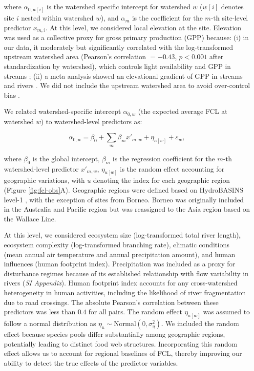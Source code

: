 \documentclass[11pt, class=article, crop=false]{standalone}
\theoremstyle{definition}
\begin{document}
where $\alpha_{0, w[i]}$ is the watershed specific intercept for watershed $w$ ($w[i]$ denotes site $i$ nested within watershed $w$), and $\alpha_m$ is the coefficient for the $m$-th site-level predictor $x_{m, i}$.
At this level, we considered local elevation at the site. 
Elevation was used as a collective proxy for gross primary production (GPP) because: (i) in our data, it moderately but significantly correlated with the log-transformed upstream watershed area (Pearson's correlation $= -0.43$, $p < 0.001$ after standardization by watershed), which controls light availability and GPP in streams \citep{finlay_light-mediated_2011, finlay_stream_2011, bernhardt_light_2022}; (ii) a meta-analysis showed an elevational gradient of GPP in streams and rivers \citep{marzolf_ecosystem_2021}.
We did not include the upstream watershed area to avoid over-control bias \citep{arif_predictive_2022}.

We related watershed-specific intercept $\alpha_{0, w}$ (the expected average FCL at watershed $w$) to watershed-level predictors as:

\begin{equation}
    \alpha_{0, w} = \beta_0 + \sum_m \beta_m x'_{m, w} + \eta_{u[w]} + \varepsilon_{w},
    \label{eq:watershed-avarage}
\end{equation}

where $\beta_0$ is the global intercept, $\beta_m$ is the regression coefficient for the $m$-th watershed-level predictor $x'_{m, w}$, $\eta_{u[w]}$ is the random effect accounting for geographic variations, with $u$ denoting the index for each geographic region (Figure \ref{fig:fcl-obs}A).
Geographic regions were defined based on HydroBASINS level-1 \citep{lehner_global_2013}, with the exception of sites from Borneo. 
Borneo was originally included in the Australia and Pacific region but was reassigned to the Asia region based on the Wallace Line.

At this level, we considered ecosystem size (log-transformed total river length), ecosystem complexity (log-transformed branching rate), climatic conditions (mean annual air temperature and annual precipitation amount), and human influences (human footprint index).
Precipitation was included as a proxy for disturbance regimes because of its established relationship with flow variability in rivers (\textit{SI Appendix}).
Human footprint index accounts for any cross-watershed heterogeneity in human activities, including the likelihood of river fragmentation due to road crossings.
The absolute Pearson’s correlation between these predictors was less than $0.4$ for all pairs.
The random effect $\eta_{u[w]}$ was assumed to follow a normal distribution as $\eta_{u} \sim \mbox{Normal}(0, \sigma_{\eta}^2)$.
We included the random effect because species pools differ substantially among geographic regions, potentially leading to distinct food web structures.
Incorporating this random effect allows us to account for regional baselines of FCL, thereby improving our ability to detect the true effects of the predictor variables.
\end{document}
